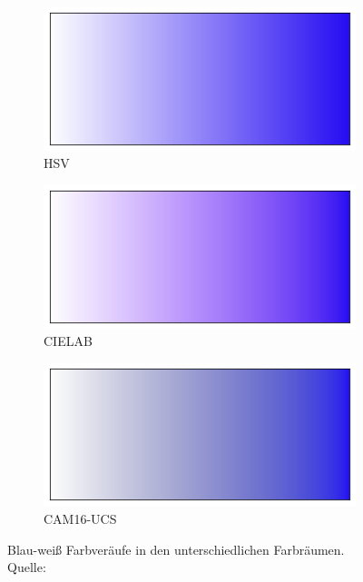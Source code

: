 \documentclass[12pt, a4paper, ngerman]{article}
\begin{document}
\begin{figure}
  \begin{subfigure}[b]{0.3\linewidth}
    \includegraphics[width=\linewidth]{Grafiken/Vergleich_Farbverlauf/hsv_blend.png}
    \caption{HSV}
    \label{fig:blend_hsv}
  \end{subfigure}
  \begin{subfigure}[b]{0.3\linewidth}
    \includegraphics[width=\linewidth]{Grafiken/Vergleich_Farbverlauf/cielab_blend.png}
    \caption{CIELAB}
    \label{fig:blend_cielab}
  \end{subfigure}
  \begin{subfigure}[b]{0.3\linewidth}
    \includegraphics[width=\linewidth]{Grafiken/Vergleich_Farbverlauf/cam16_blend.png}
    \caption{CAM16-UCS}
    \label{fig:blend_cam}
  \end{subfigure}

  \caption{Blau-weiß Farbveräufe in den unterschiedlichen Farbräumen. Quelle:~\cite{Oklab_2020}}
  \label{fig:blend_comp}
\end{figure}
\end{document}
